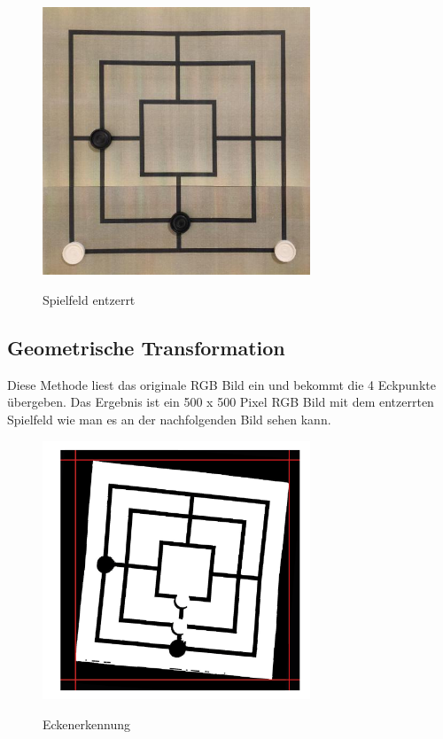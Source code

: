 \documentclass[paper=A4, deutsch]{scrartcl}
\begin{document}
\begin{figure}[ht]
	\centering
		\includegraphics[width=8cm]{Spielbrett_Entzerrt.png}\\
	\caption[Spielfeld entzerrt]{Spielfeld entzerrt}
	\label{fig:nettop}
\end{figure}

\subsection{Geometrische Transformation}
Diese Methode liest das originale RGB Bild ein und bekommt die 4 Eckpunkte übergeben. Das Ergebnis ist ein 500 x 500 Pixel RGB Bild mit dem entzerrten Spielfeld wie man es an der nachfolgenden Bild sehen kann.\\

\begin{figure}[ht]
	\centering
		\includegraphics[width=8cm]{Ecken.png}\\
	\caption[Eckenerkennung]{Eckenerkennung}
	\label{fig:nettop}
\end{figure}
\end{document}

